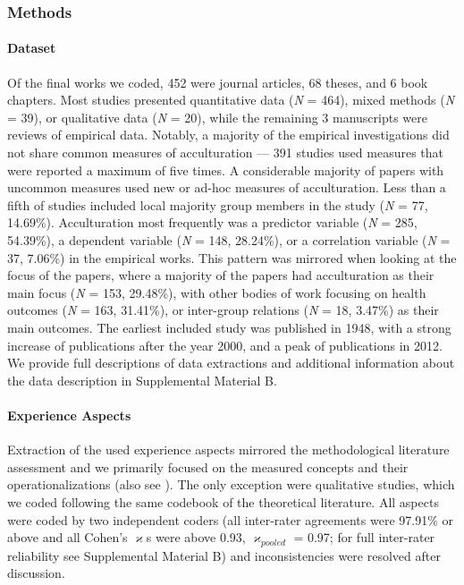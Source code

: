 \subsubsection{Methods}

\paragraph{Dataset}

Of the final works we coded, 452 were journal articles, 68 theses, and 6
book chapters. Most studies presented quantitative data (\textit{N} =
464), mixed methods (\textit{N} = 39), or qualitative data (\textit{N} =
20), while the remaining 3 manuscripts were reviews of empirical data.
Notably, a majority of the empirical investigations did not share common
measures of acculturation --- 391 studies used measures that were
reported a maximum of five times. A considerable majority of papers with
uncommon measures used new or ad-hoc measures of acculturation. Less
than a fifth of studies included local majority group members in the
study (\textit{N} = 77, 14.69\%). Acculturation most frequently was a
predictor variable (\textit{N} = 285, 54.39\%), a dependent variable
(\textit{N} = 148, 28.24\%), or a correlation variable (\textit{N} = 37,
7.06\%) in the empirical works. This pattern was mirrored when looking
at the focus of the papers, where a majority of the papers had
acculturation as their main focus (\textit{N} = 153, 29.48\%), with
other bodies of work focusing on health outcomes (\textit{N} = 163,
31.41\%), or inter-group relations (\textit{N} = 18, 3.47\%) as their
main outcomes. The earliest included study was published in 1948, with a
strong increase of publications after the year 2000, and a peak of
publications in 2012. We provide full descriptions of data extractions
and additional information about the data description in Supplemental
Material B.

\paragraph{Experience Aspects}

Extraction of the used experience aspects mirrored the methodological
literature assessment and we primarily focused on the measured concepts
and their operationalizations (also see ).
The only exception were qualitative studies, which we coded following
the same codebook of the theoretical literature. All aspects were coded
by two independent coders (all inter-rater agreements were 97.91\% or
above and all Cohen's \(\varkappa\)s were above 0.93,
\(\varkappa_{pooled}\) = 0.97; for full inter-rater reliability see
Supplemental Material B) and inconsistencies were resolved after
discussion.

